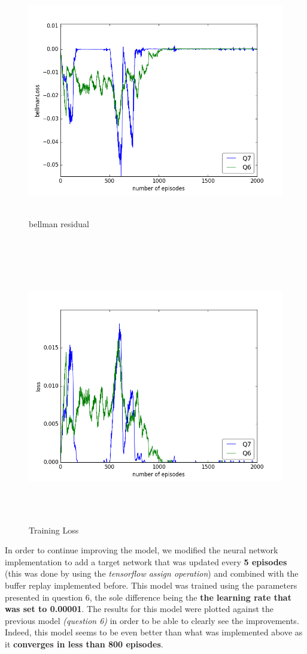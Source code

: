 \documentclass{report}
\begin{document}
\begin{figure}[H]
    \begin{minipage}[c]{.49\linewidth}
        \centering
        \includegraphics[width = \linewidth]{plots/a7/bellmanLoss.png}
        \caption{bellman residual}
    \end{minipage}
    \hfill%
    \begin{minipage}[c]{.49\linewidth}
        \centering
        \includegraphics[width = \linewidth]{plots/a7/loss.png}
        \caption{Training Loss}
    \end{minipage}
\end{figure}

In order to continue improving the model, we modified the neural network implementation to add a target network that was updated every \textbf{5 episodes} (this was done by using the \textit{tensorflow assign operation}) and combined with the buffer replay implemented before. This model was trained using the parameters presented in question 6, the sole difference being the \textbf{the learning rate that was set to 0.00001}. The results for this model were plotted against the previous model \textit{(question 6)} in order to be able to clearly see the improvements. Indeed, this model seems to be even better than what was implemented above as it \textbf{converges in less than 800 episodes}. 
\end{document}
